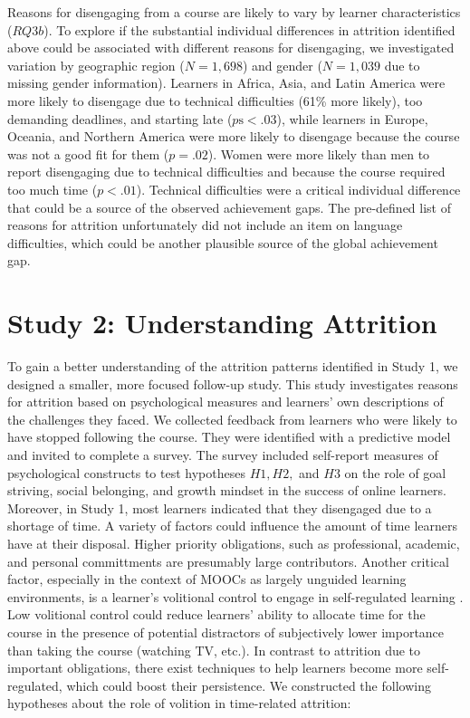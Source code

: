 \documentclass{sigchi}\usepackage[]{graphicx}\usepackage[]{color}
\begin{document}
Reasons for disengaging from a course are likely to vary by learner characteristics ($RQ3b$). To explore if the substantial individual differences in attrition identified above could be associated with different reasons for disengaging, we investigated variation by geographic region ($N = 1,698$) and gender ($N = 1,039$ due to missing gender information). Learners in Africa, Asia, and Latin America were more likely to disengage due to technical difficulties (61\% more likely), too demanding deadlines, and starting late ($p\text{s} < .03$), while learners in Europe, Oceania, and Northern America were more likely to disengage because the course was not a good fit for them ($p=.02$). Women were more likely than men to report disengaging due to technical difficulties and because the course required too much time ($p<.01$). Technical difficulties were a critical individual difference that could be a source of the observed achievement gaps. The pre-defined list of reasons for attrition unfortunately did not include an item on language difficulties, which could be another plausible source of the global achievement gap.


\section{Study 2: Understanding Attrition}

To gain a better understanding of the attrition patterns identified in Study 1, we designed a smaller, more focused follow-up study. This study investigates reasons for attrition based on psychological measures and learners' own descriptions of the challenges they faced. We collected feedback from learners who were likely to have stopped following the course. They were identified with a predictive model and invited to complete a survey. The survey included self-report measures of psychological constructs to test hypotheses $H1, H2,$ and $H3$ on the role of goal striving, social belonging, and growth mindset in the success of online learners. Moreover, in Study 1, most learners indicated that they disengaged due to a shortage of time. A variety of factors could influence the amount of time learners have at their disposal. Higher priority obligations, such as professional, academic, and personal committments are presumably large contributors. Another critical factor, especially in the context of MOOCs as largely unguided learning environments, is a learner's volitional control to engage in self-regulated learning \cite{corno2001volitional}. Low volitional control could reduce learners' ability to allocate time for the course in the presence of potential distractors of subjectively lower importance than taking the course (watching TV, etc.). In contrast to attrition due to important obligations, there exist techniques to help learners become more self-regulated, which could boost their persistence. We constructed the following hypotheses about the role of volition in time-related attrition:
\end{document}

